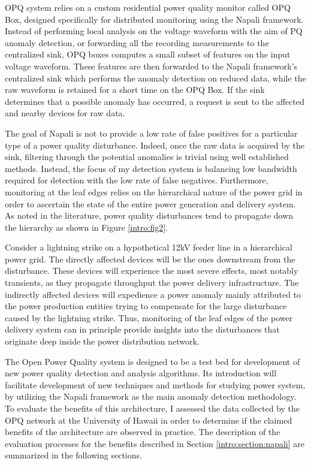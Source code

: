 OPQ system relies on a custom residential power quality monitor called OPQ Box, designed specifically for distributed monitoring using the Napali framework.
Instead of performing local analysis on the voltage waveform with the aim of PQ anomaly detection, or forwarding all the recording measurements to the centralized sink, OPQ boxes computes a small subset of features on the input voltage waveform.
These features are then forwarded to the Napali framework's centralized sink which performs the anomaly detection on reduced data, while the raw waveform is retained for a short time on the OPQ Box.
If the sink determines that a possible anomaly has occurred, a request is sent to the affected and nearby devices for raw data.

The goal of Napali is not to provide a low rate of false positives for a particular type of a power quality disturbance.
Indeed, once the raw data is acquired by the sink, filtering through the potential anomalies is trivial using well established methods.
Instead, the focus of my detection system is balancing low bandwidth required for detection with the low rate of false negatives.
Furthermore, monitoring at the leaf edges relies on the hierarchical nature of the power grid in order to ascertain the state of the entire power generation and delivery system.
As noted in the literature, power quality disturbances tend to propagate down the hierarchy as shown in Figure \ref{intro:fig2}.


Consider a lightning strike on a hypothetical 12kV feeder line in a hierarchical power grid.
The directly affected devices will be the ones downstream from the disturbance.
These devices will experience the most severe effects, most notably transients, as they propagate throughput the power delivery infrastructure.
The indirectly affected devices will expedience a power anomaly mainly attributed to the power production entities trying to compensate for the large disturbance caused by the lightning strike.
Thus, monitoring of the leaf edges of the power delivery system can in principle provide insights into the disturbances that originate deep inside the power distribution network.

The Open Power Quality system is designed to be a test bed for development of new power quality detection and analysis algorithms.
Its introduction will facilitate development of new techniques and methods for studying power system, by utilizing the Napali framework as the main anomaly detection methodology.
To evaluate the benefits of this architecture, I assessed the data collected by the OPQ network at the University of Hawaii in order to determine if the claimed benefits of the architecture are observed in practice.
The description of the evaluation processes for the benefits described in Section \ref{intro:section:napali} are summarized in the following sections.


